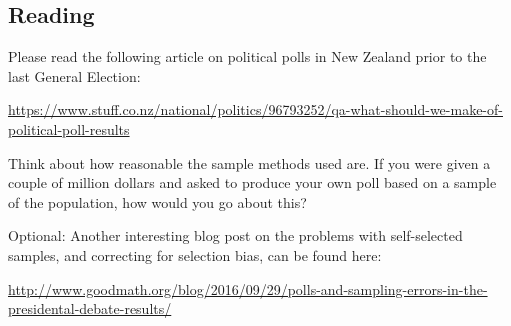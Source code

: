 



\subsection*{Reading}
Please read the following article on political polls in New Zealand prior to the last General Election:
\begin{center}
  \url{https://www.stuff.co.nz/national/politics/96793252/qa-what-should-we-make-of-political-poll-results}
\end{center}
Think about how reasonable the sample methods used are. If you were given a couple of million dollars and asked to produce
your own poll based on a sample of the population, how would you go about this?

Optional: Another interesting blog post on the problems with self-selected samples, and correcting for selection bias, can be found here:
\begin{center}
  \url{http://www.goodmath.org/blog/2016/09/29/polls-and-sampling-errors-in-the-presidental-debate-results/}
\end{center}

